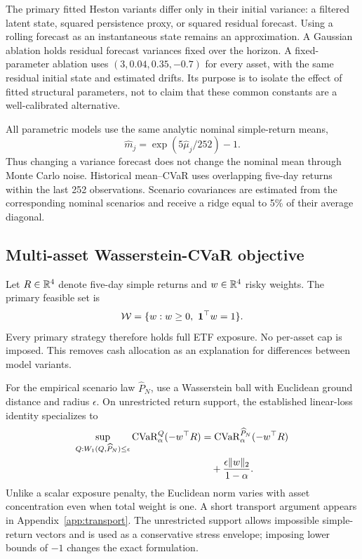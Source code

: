The primary fitted Heston variants differ only in their initial variance: a filtered latent state, squared persistence proxy, or squared residual forecast. Using a rolling forecast as an instantaneous state remains an approximation. A Gaussian ablation holds residual forecast variances fixed over the horizon. A fixed-parameter ablation uses $(3,0.04,0.35,-0.7)$ for every asset, with the same residual initial state and estimated drifts. Its purpose is to isolate the effect of fitted structural parameters, not to claim that these common constants are a well-calibrated alternative.

All parametric models use the same analytic nominal simple-return means,
\begin{equation}
\widehat m_j=\exp(5\widehat\mu_j/252)-1.
\end{equation}
Thus changing a variance forecast does not change the nominal mean through Monte Carlo noise. Historical mean--CVaR uses overlapping five-day returns within the last 252 observations. Scenario covariances are estimated from the corresponding nominal scenarios and receive a ridge equal to 5\% of their average diagonal.

\subsection{Multi-asset Wasserstein-CVaR objective}
Let $R\in\mathbb{R}^4$ denote five-day simple returns and $w\in\mathbb{R}^4$ risky weights. The primary feasible set is
\begin{equation}
\mathcal{W}=\{w:w\geq0,\ \boldsymbol1^\top w=1\}.
\end{equation}
Every primary strategy therefore holds full ETF exposure. No per-asset cap is imposed. This removes cash allocation as an explanation for differences between model variants.

For the empirical scenario law $\widehat P_N$, use a Wasserstein ball with Euclidean ground distance and radius $\epsilon$. On unrestricted return support, the established linear-loss identity specializes to
\begin{align}
\sup_{Q:W_1(Q,\widehat P_N)\leq\epsilon}\operatorname{CVaR}_\alpha^Q(-w^\top R)
&=\operatorname{CVaR}_\alpha^{\widehat P_N}(-w^\top R)\notag\\
&\quad+\frac{\epsilon\lVert w\rVert_2}{1-\alpha}.
\label{eq:vector_dro}
\end{align}
Unlike a scalar exposure penalty, the Euclidean norm varies with asset concentration even when total weight is one. A short transport argument appears in Appendix~\ref{app:transport}. The unrestricted support allows impossible simple-return vectors and is used as a conservative stress envelope; imposing lower bounds of $-1$ changes the exact formulation.

